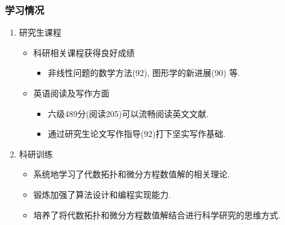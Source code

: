 \documentclass[UTF8]{ctexbeamer}	%
\theoremstyle{plain}
\theoremstyle{definition}
\theoremstyle{remark}
\numberwithin{equation}{section}
\begin{document}
\begin{frame}[fragile]
    \frametitle{学习情况}
\begin{enumerate}
    \item 研究生课程
    \begin{itemize}
        \item 科研相关课程获得良好成绩
        \begin{itemize}
            \item 非线性问题的数学方法(92), 图形学的新进展(90) 等.
        \end{itemize}
        \item 英语阅读及写作方面
        \begin{itemize}
            \item 六级489分(阅读205)可以流畅阅读英文文献.
            \item 通过研究生论文写作指导(92)打下坚实写作基础.
        \end{itemize}
    \end{itemize}
    \item 科研训练
    \begin{itemize}
        \item 系统地学习了代数拓扑和微分方程数值解的相关理论.
        \item 锻炼加强了算法设计和编程实现能力.
        \item 培养了将代数拓扑和微分方程数值解结合进行科学研究的思维方式.
    \end{itemize}
\end{enumerate}
\end{frame}

\end{document}
